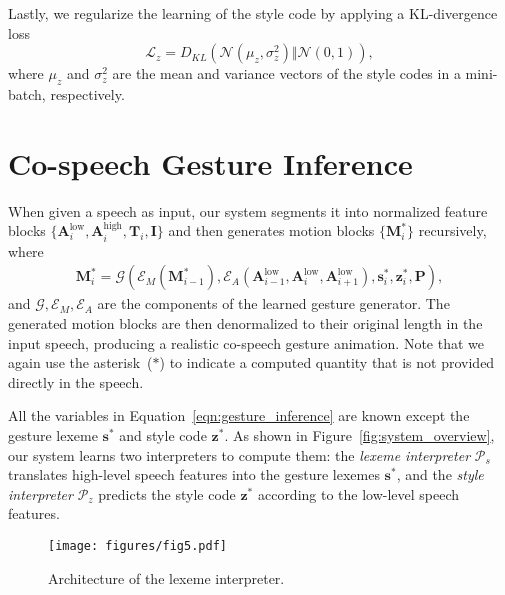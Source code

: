 \documentclass[acmtog,authorversion]{acmart}
\newcommand{\vect}[1]{\bm{#1}}
\newcommand{\eqword}[1]{{\text{#1}}}
\newcommand{\fig}{Figure{}~}
\newcommand{\eqn}{Equation{}~}
\begin{document}
Lastly, we regularize the learning of the style code by applying a KL-divergence loss
\begin{equation}
    \mathcal{L}_{z} = D_{KL}(\mathcal{N}(\mu_z, \sigma^2_z) \Vert \mathcal{N}(0, 1)),
\end{equation}
where $\mu_z$ and $\sigma^2_z$ are the mean and variance vectors of the style codes in a mini-batch, respectively. \section{Co-speech Gesture Inference}
\label{sec:co-speech_gesture_inference}
When given a speech as input, our system segments it into normalized feature blocks $\{\vect{A}_i^{\eqword{low}}, \vect{A}_i^{\eqword{high}}, \vect{T}_i, \vect{I}\}$ and then generates motion blocks $\{\vect{M}_i^*\}$ recursively, where 
\begin{align}
    \vect{M}_i^* = \mathcal{G}\left(
        \mathcal{E}_M\left(\vect{M}_{i-1}^*\right), 
        \mathcal{E}_A\left(\vect{A}^{\eqword{low}}_{i-1}, \vect{A}^{\eqword{low}}_{i}, \vect{A}^{\eqword{low}}_{i+1}\right), 
        \vect{s}_i^*, \vect{z}_i^*, \vect{P}
        \right),
    \label{eqn:gesture_inference}
\end{align}
and $\mathcal{G}, \mathcal{E}_M, \mathcal{E}_A$ are the components of the learned gesture generator. The generated motion blocks are then denormalized to their original length in the input speech, producing a realistic co-speech gesture animation. Note that we again use the asterisk~($*$) to indicate a computed quantity that is not provided directly in the speech. 

All the variables in \eqn\eqref{eqn:gesture_inference} are known except the gesture lexeme $\vect{s}^*$ and style code $\vect{z}^*$. As shown in \fig\ref{fig:system_overview}, our system learns two interpreters to compute them: the \emph{lexeme interpreter} $\mathcal{P}_s$ translates high-level speech features into the gesture lexemes $\vect{s}^*$, and the \emph{style interpreter} $\mathcal{P}_z$ predicts the style code $\vect{z}^*$ according to the low-level speech features. 

\begin{figure}[t]
    \centering
    \texttt{[image: figures/fig5.pdf]}
    \caption{Architecture of the lexeme interpreter.}
    \Description{}
    \label{fig:interpreters}
\end{figure}
\end{document}

